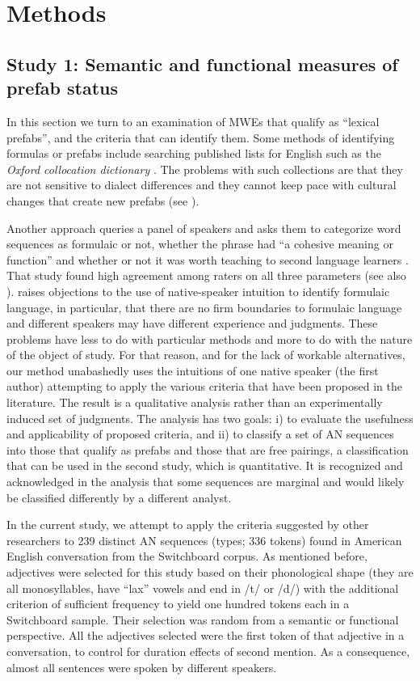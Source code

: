 \documentclass[output=paper]{langscibook}
\begin{document}
\section{Methods}\label{sec:bybee:3}
\subsection{Study 1: Semantic and functional measures of prefab status}\label{sec:bybee:3.1}

In this section we turn to an examination of MWEs that qualify as ``lexical prefabs'', and the criteria that can identify them. Some methods of identifying formulas or prefabs include searching published lists for English such as the \textit{Oxford collocation dictionary} \citep{OxfordCollocationsDictionary2002}. The problems with such collections are that they are not sensitive to dialect differences and they cannot keep pace with cultural changes that create new prefabs (see \citealt{DurrantDoherty2010}).

Another approach queries a panel of speakers and asks them to categorize word sequences as formulaic or not, whether the phrase had ``a cohesive meaning or function'' and whether or not it was worth teaching to second language learners \citep{EllisMaynard2008}. That study found high agreement among raters on all three parameters (see also \citealt{CarrolConklin2014}). \citet{Wray2002} raises objections to the use of native-speaker intuition to identify formulaic language, in particular, that there are no firm boundaries to formulaic language and different speakers may have different experience and judgments. These problems have less to do with particular methods and more to do with the nature of the object of study. For that reason, and for the lack of workable alternatives, our method unabashedly uses the intuitions of one native speaker (the first author) attempting to apply the various criteria that have been proposed in the literature. The result is a qualitative analysis rather than an experimentally induced set of judgments. The analysis has two goals: i) to evaluate the usefulness and applicability of proposed criteria, and ii) to classify a set of AN sequences into those that qualify as prefabs and those that are free  pairings, a classification that can be used in the second study, which is quantitative. It is recognized and acknowledged in the analysis that some sequences are marginal and would likely be classified differently by a different analyst. 

In the current study, we attempt to apply the criteria suggested by other researchers to 239 distinct AN sequences (types; 336 tokens) found in American English conversation from the Switchboard corpus. As mentioned before, adjectives were selected for this study based on their phonological shape (they are all monosyllables, have ``lax'' vowels and end in /t/ or /d/) with the additional criterion of sufficient frequency to yield one hundred tokens each in a Switchboard sample. Their selection was random from a semantic or functional perspective. All the adjectives selected were the first token of that adjective in a conversation, to control for duration effects of second mention. As a consequence, almost all sentences were spoken by different speakers. 
\end{document}
